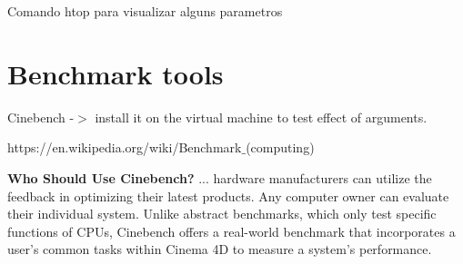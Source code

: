\documentclass[11pt, a4paper, oneside]{article}
\theoremstyle{definition}
\begin{document}
Comando htop para visualizar alguns parametros
\vfill
\pagebreak
\section{Benchmark tools}
Cinebench -$>$ install it on the virtual machine to test effect of arguments.

https://en.wikipedia.org/wiki/Benchmark$\_$(computing)

\textbf{Who Should Use Cinebench? }
... hardware manufacturers can utilize the feedback in optimizing their latest products. Any computer owner can evaluate their individual system. Unlike abstract benchmarks, which only test specific functions of CPUs, Cinebench offers a real-world benchmark that incorporates a user's common tasks within Cinema 4D to measure a system's performance.\\
\end{document}
